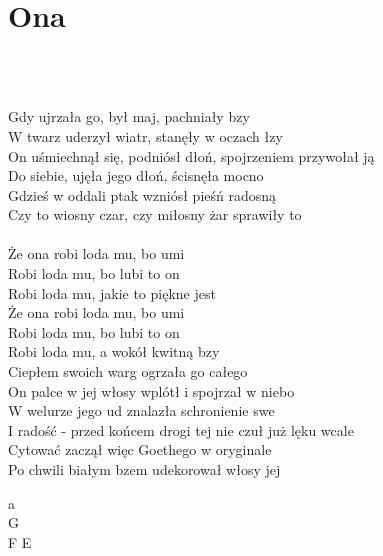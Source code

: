 \documentclass[a5paper, 10pt]{book}
\begin{document}
\section{Ona}\textcolor{lightgray}{\textit{}}\\~\\
\begin{minipage}[t]{0.8\textwidth}
  Gdy ujrzała go, był maj, pachniały bzy\\
  W twarz uderzył wiatr, stanęły w oczach łzy\\
  On uśmiechnął się, podniósł dłoń, spojrzeniem przywołał ją\\
  Do siebie, ujęła jego dłoń, ścisnęła mocno\\
  Gdzieś w oddali ptak wzniósł pieśń radosną\\
  Czy to wiosny czar, czy miłosny żar sprawiły to\\
  \\
  \hspace*{5mm}Że ona robi loda mu, bo umi\\
  \hspace*{5mm}Robi loda mu, bo lubi to on\\
  \hspace*{5mm}Robi loda mu, jakie to piękne jest\\
  \hspace*{5mm}Że ona robi loda mu, bo umi\\
  \hspace*{5mm}Robi loda mu, bo lubi to on\\
  \hspace*{5mm}Robi loda mu, a wokół kwitną bzy\\

  Ciepłem swoich warg ogrzała go całego\\
  On palce w jej włosy wplótł i spojrzał w niebo\\
  W welurze jego ud znalazła schronienie swe\\
  I radość - przed końcem drogi tej nie czuł już lęku wcale\\
  Cytować zaczął więc Goethego w oryginale\\
  Po chwili białym bzem udekorował włosy jej\\

\end{minipage}
\begin{minipage}[t]{0.2\textwidth}
  a\\
  G\\
  F E\\
\end{minipage}
\end{document}
